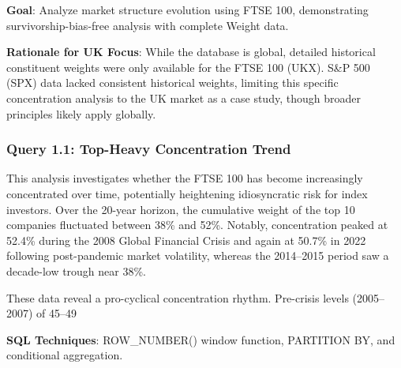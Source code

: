 \documentclass[10pt,a4paper]{article}
\begin{document}
\textbf{Goal}: Analyze market structure evolution using FTSE 100, demonstrating survivorship-bias-free analysis with complete Weight data.

\textbf{Rationale for UK Focus}: While the database is global, detailed historical constituent weights were only available for the FTSE 100 (UKX). S\&P 500 (SPX) data lacked consistent historical weights, limiting this specific concentration analysis to the UK market as a case study, though broader principles likely apply globally.

\subsubsection{Query 1.1: Top-Heavy Concentration Trend}
This analysis investigates whether the FTSE 100 has become increasingly concentrated over time, potentially heightening idiosyncratic risk for index investors. Over the 20-year horizon, the cumulative weight of the top 10 companies fluctuated between 38\% and 52\%. Notably, concentration peaked at 52.4\% during the 2008 Global Financial Crisis and again at 50.7\% in 2022 following post-pandemic market volatility, whereas the 2014--2015 period saw a decade-low trough near 38\%.

These data reveal a pro-cyclical concentration rhythm. Pre-crisis levels (2005--2007) of 45--49%

\textbf{SQL Techniques}: ROW\_NUMBER() window function, PARTITION BY, and conditional aggregation.

\end{document}
